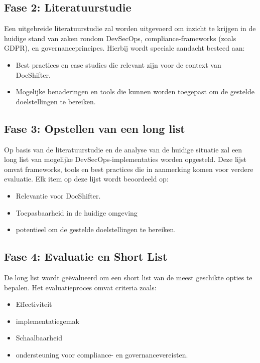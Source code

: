 \documentclass{hogent-article}
\begin{document}
    \subsection{Fase 2: Literatuurstudie}
    \noindent Een uitgebreide literatuurstudie zal worden uitgevoerd om inzicht te krijgen in de huidige stand van zaken rondom DevSecOps, compliance-frameworks (zoals GDPR), en governanceprincipes. Hierbij wordt speciale aandacht besteed aan:
    
    \begin{itemize}
        \item Best practices en case studies die relevant zijn voor de context van DocShifter.
        \item Mogelijke benaderingen en tools die kunnen worden toegepast om de gestelde doelstellingen te bereiken.
    \end{itemize}
    
    \subsection{Fase 3: Opstellen van een long list}
    \noindent Op basis van de literatuurstudie en de analyse van de huidige situatie zal een long list van mogelijke DevSecOps-implementaties worden opgesteld. Deze lijst omvat frameworks, tools en best practices die in aanmerking komen voor verdere evaluatie. Elk item op deze lijst wordt beoordeeld op:
    
    \begin{itemize}
        \item Relevantie voor DocShifter.
        \item Toepasbaarheid in de huidige omgeving
        \item potentieel om de gestelde doelstellingen te bereiken.
    \end{itemize}

    \subsection{Fase 4: Evaluatie en Short List}
    \noindent De long list wordt geëvalueerd om een short list van de meest geschikte opties te bepalen. Het evaluatieproces omvat criteria zoals:
    
    \begin{itemize}
        \item Effectiviteit
        \item implementatiegemak
        \item Schaalbaarheid
        \item ondersteuning voor compliance- en governancevereisten.
    \end{itemize}
    
\end{document}

